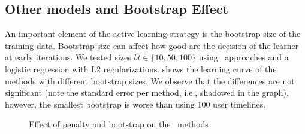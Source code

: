 \subsection{Other models and Bootstrap Effect}

An important element of the active learning strategy is the bootstrap size of the training data. Bootstrap size can affect how good are the decision of the learner at early iterations. We tested sizes $bt \in \{10, 50, 100\}$ using \SR\ approaches and a logistic regression with L2 regularizations.  shows the learning curve of the methods with different bootstrap sizes. We observe that the differences are not significant (note the standard error per method, i.e., shadowed in the graph), however, the smallest bootstrap is worse than using 100 user timelines. 

\begin{figure}[t]
		\vskip -0.15in
		\caption{Effect of penalty and bootstrap on the \SR\ methods}
	\vskip -0.1in
\end{figure}

